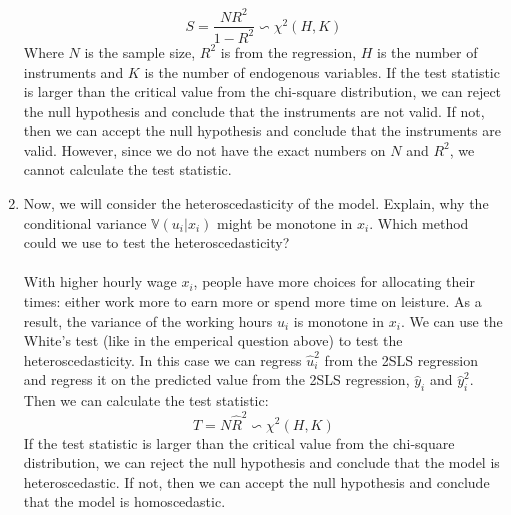 \documentclass[12pt]{article}
\begin{document}
\begin{flushleft}
\begin{enumerate}
    \[
    S=\frac{NR^2}{1-R^2} \backsim \chi^2(H,K)
    \]
    Where $N$ is the sample size, $R^2$ is from the regression, $H$ is the number of instruments and $K$ is the number of endogenous variables. If the test statistic is larger than the critical value from the chi-square distribution, we can reject the null hypothesis and conclude that the instruments are not valid. If not, then we can accept the null hypothesis and conclude that the instruments are valid. However, since we do not have the exact numbers on $N$ and $R^2$, we cannot calculate the test statistic.\\
    \item Now, we will consider the heteroscedasticity of the model. Explain, why the conditional variance $\mathbb{V}(u_i|x_i)$ might be monotone in $x_i$. Which method could we use to test the heteroscedasticity?\\~\\
    With higher hourly wage $x_i$, people have more choices for allocating their times: either work more to earn more or spend more time on leisture. As a result, the variance of the working hours $u_i$ is monotone in $x_i$. We can use the White's test (like in the emperical question above) to test the heteroscedasticity. In this case we can regress $\hat{u}_i^2$ from the 2SLS regression and regress it on the predicted value from the 2SLS regression, $\hat{y}_i$ and $\hat{y}_i^2$. Then we can calculate the test statistic:
    \[
    T=N\hat{R}^2 \backsim \chi^2(H,K)
    \]
    If the test statistic is larger than the critical value from the chi-square distribution, we can reject the null hypothesis and conclude that the model is heteroscedastic. If not, then we can accept the null hypothesis and conclude that the model is homoscedastic.\\
\end{enumerate}
\end{flushleft}
\end{document}
